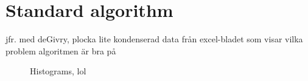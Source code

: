 \section{Standard algorithm}
jfr. med deGivry, plocka lite kondenserad data från excel-bladet som visar vilka problem algoritmen är bra på


\begin{figure}
	\caption{Histograms, lol}
\end{figure}
